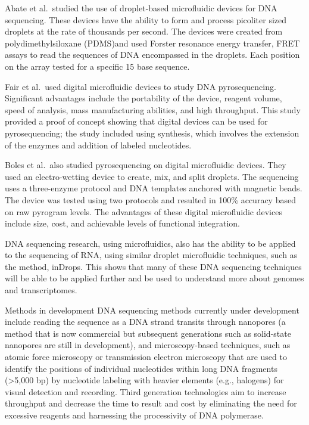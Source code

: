 Abate et al.~studied the use of droplet-based microfluidic devices for DNA sequencing. These devices have the ability to form and process picoliter sized droplets at the rate of thousands per second. The devices were created from polydimethylsiloxane (PDMS)and used Forster resonance energy transfer, FRET assays to read the sequences of DNA encompassed in the droplets. Each position on the array tested for a specific 15 base sequence.

Fair et al.~used digital microfluidic devices to study DNA pyrosequencing. Significant advantages include the portability of the device, reagent volume, speed of analysis, mass manufacturing abilities, and high throughput. This study provided a proof of concept showing that digital devices can be used for pyrosequencing; the study included using synthesis, which involves the extension of the enzymes and addition of labeled nucleotides.

Boles et al.~also studied pyrosequencing on digital microfluidic devices. They used an electro-wetting device to create, mix, and split droplets. The sequencing uses a three-enzyme protocol and DNA templates anchored with magnetic beads. The device was tested using two protocols and resulted in 100\% accuracy based on raw pyrogram levels. The advantages of these digital microfluidic devices include size, cost, and achievable levels of functional integration.

DNA sequencing research, using microfluidics, also has the ability to be applied to the sequencing of RNA, using similar droplet microfluidic techniques, such as the method, inDrops. This shows that many of these DNA sequencing techniques will be able to be applied further and be used to understand more about genomes and transcriptomes.

Methods in development
DNA sequencing methods currently under development include reading the sequence as a DNA strand transits through nanopores (a method that is now commercial but subsequent generations such as solid-state nanopores are still in development), and microscopy-based techniques, such as atomic force microscopy or transmission electron microscopy that are used to identify the positions of individual nucleotides within long DNA fragments (\textgreater{}5,000 bp) by nucleotide labeling with heavier elements (e.g., halogens) for visual detection and recording. Third generation technologies aim to increase throughput and decrease the time to result and cost by eliminating the need for excessive reagents and harnessing the processivity of DNA polymerase.

